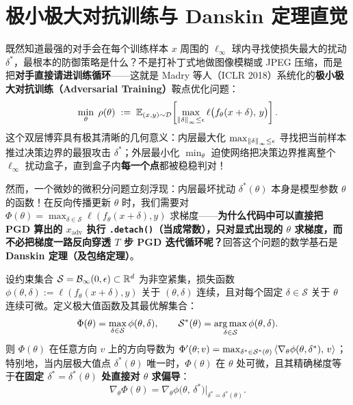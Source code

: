 \section{极小极大对抗训练与 Danskin 定理直觉}

既然知道最强的对手会在每个训练样本 $x$ 周围的 $\ell_\infty$ 球内寻找使损失最大的扰动 $\delta^*$，最根本的防御策略是什么？不是打补丁式地做图像模糊或 JPEG 压缩，而是把\textbf{对手直接请进训练循环}——这就是 Madry 等人（ICLR 2018）系统化的\textbf{极小极大对抗训练（Adversarial Training）}鞍点优化问题：
\begin{equation}\label{eq:madry-minmax}
  \min_{\theta}\; \rho(\theta)
  \;:=\; \mathbb{E}_{(x, y) \sim \mathcal{D}}\!\left[ \max_{\left\|\delta\right\|_\infty \le \epsilon} \ell\big(f_\theta(x + \delta),\, y\big) \right].
\end{equation}
这个双层博弈具有极其清晰的几何意义：内层最大化 $\max_{\left\|\delta\right\|_\infty\le\epsilon}$ 寻找把当前样本推过决策边界的最狠攻击 $\delta^*$；外层最小化 $\min_\theta$ 迫使网络把决策边界推离整个 $\ell_\infty$ 扰动盒子，直到盒子内\textbf{每一个点}都被稳稳判对！

然而，一个微妙的微积分问题立刻浮现：内层最坏扰动 $\delta^*(\theta)$ 本身是模型参数 $\theta$ 的函数！在反向传播更新 $\theta$ 时，我们需要对 $\Phi(\theta) = \max_{\delta \in \mathcal{S}} \ell(f_\theta(x + \delta), y)$ 求梯度——\textbf{为什么代码中可以直接把 PGD 算出的 $x_{\text{adv}}$ 执行 \texttt{.detach()}（当成常数），只对显式出现的 $\theta$ 求梯度，而不必把梯度一路反向穿透 $T$ 步 PGD 迭代循环呢？}回答这个问题的数学基石是\textbf{Danskin 定理（及包络定理）}。

\begin{thmBox}
\begin{theorem}\label{thm:danskin}
设约束集合 $\mathcal{S} = \mathcal{B}_\infty(0, \epsilon) \subset \mathbb{R}^d$ 为非空紧集，损失函数 $\phi(\theta, \delta) := \ell(f_\theta(x + \delta), y)$ 关于 $(\theta, \delta)$ 连续，且对每个固定 $\delta \in \mathcal{S}$ 关于 $\theta$ 连续可微。定义极大值函数及其最优解集合：
\[
  \Phi(\theta) = \max_{\delta \in \mathcal{S}} \phi(\theta, \delta),
  \qquad
  \mathcal{S}^*(\theta) = \operatorname*{arg\,max}_{\delta \in \mathcal{S}} \phi(\theta, \delta).
\]
则 $\Phi(\theta)$ 在任意方向 $v$ 上的方向导数为 $\Phi'(\theta; v) = \max_{\delta^* \in \mathcal{S}^*(\theta)} \left\langle \nabla_\theta \phi(\theta, \delta^*),\, v \right\rangle$；特别地，当内层极大值点 $\delta^*(\theta)$ 唯一时，$\Phi(\theta)$ 在 $\theta$ 处可微，且其精确梯度等于\textbf{在固定 $\delta^* = \delta^*(\theta)$ 处直接对 $\theta$ 求偏导}：
\begin{equation}\label{eq:danskin-grad}
  \nabla_\theta \Phi(\theta) = \nabla_\theta \phi\big(\theta,\, \delta^*\big)\Big|_{\delta^* = \delta^*(\theta)}.
\end{equation}
\end{theorem}
\end{thmBox}

